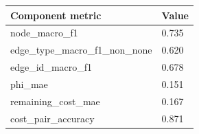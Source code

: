 \begin{tabular}{ll}
\toprule
Component metric & Value \\
\midrule
node\_macro\_f1 & 0.735 \\
edge\_type\_macro\_f1\_non\_none & 0.620 \\
edge\_id\_macro\_f1 & 0.678 \\
phi\_mae & 0.151 \\
remaining\_cost\_mae & 0.167 \\
cost\_pair\_accuracy & 0.871 \\
\bottomrule
\end{tabular}

